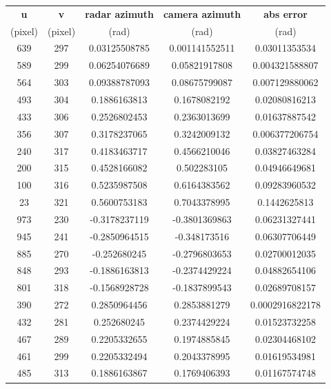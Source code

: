 \begin{table}[htbp]
    \centering
    \begin{tabular}{|c|c|c|c|c|}
    \hline
    \textbf{u} & \textbf{v }  & \textbf{radar azimuth} & \textbf{camera azimuth} & \textbf{abs error} \\ 
    (pixel)   &(pixel)          &(rad)                  &(rad)&(rad)\\%
    \hline
        639 & 297 & 0.03125508785 & 0.001141552511 & 0.03011353534 \\
        589 & 299 & 0.06254076689 & 0.05821917808 & 0.004321588807 \\
        564 & 303 & 0.09388787093 & 0.08675799087 & 0.007129880062 \\
        493 & 304 & 0.1886163813 & 0.1678082192 & 0.02080816213 \\
        433 & 306 & 0.2526802453 & 0.2363013699 & 0.01637887542 \\
        356 & 307 & 0.3178237065 & 0.3242009132 & 0.006377206754 \\
        240 & 317 & 0.4183463717 & 0.4566210046 & 0.03827463284 \\
        200 & 315 & 0.4528166082 & 0.502283105 & 0.04946649681 \\
        100 & 316 & 0.5235987508 & 0.6164383562 & 0.09283960532 \\
        23 & 321 & 0.5600753183 & 0.7043378995 & 0.1442625813 \\
        973 & 230 & -0.3178237119 & -0.3801369863 & 0.06231327441 \\
        945 & 241 & -0.2850964515 & -0.348173516 & 0.06307706449 \\
        885 & 270 & -0.252680245 & -0.2796803653 & 0.02700012035 \\
        848 & 293 & -0.1886163813 & -0.2374429224 & 0.04882654106 \\
        801 & 318 & -0.1568928728 & -0.1837899543 & 0.02689708157 \\
        390 & 272 & 0.2850964456 & 0.2853881279 & 0.0002916822178 \\
        432 & 281 & 0.252680245 & 0.2374429224 & 0.01523732258 \\
        467 & 289 & 0.2205332655 & 0.1974885845 & 0.02304468102 \\
        461 & 299 & 0.2205332494 & 0.2043378995 & 0.01619534981 \\
        485 & 313 & 0.1886163867 & 0.1769406393 & 0.01167574748 \\

\end{tabular}
\end{table}
